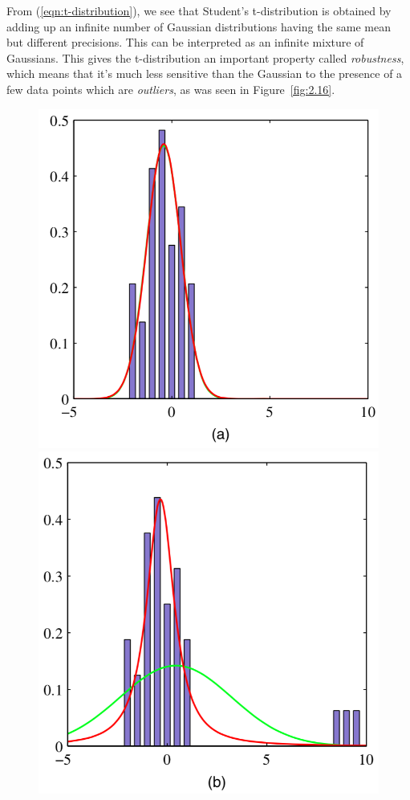 \documentclass[5p,sort&compress]{elsarticle}
\begin{document}
From (\ref{eqn:t-distribution}), we see that Student's t-distribution is obtained by adding up an infinite number of Gaussian distributions having the same mean but different precisions. This can be interpreted as an infinite mixture of Gaussians. This gives the t-distribution an important property called \textit{robustness}, which means that it's much less sensitive than the Gaussian to the presence of a few data points which are \textit{outliers}, as was seen in Figure~\ref{fig:2.16}.

\begin{figure}
     \centering
     \includegraphics[width = \linewidth]{figure/fig2-16-1.png}
     \includegraphics[width = \linewidth]{figure/fig2-16-2.png}     

\end{figure}
\end{document}
